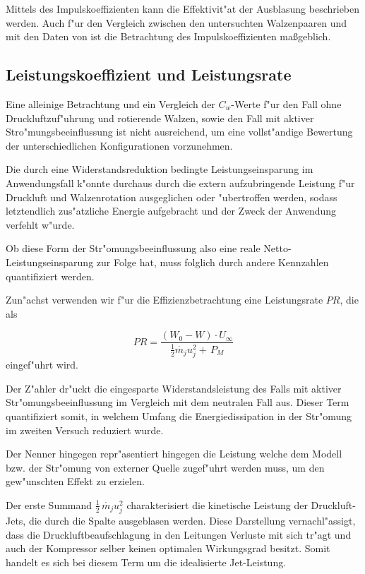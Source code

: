 Mittels des Impulskoeffizienten kann die Effektivit"at der Ausblasung beschrieben werden.
Auch f"ur den Vergleich zwischen den untersuchten Walzenpaaren und mit den Daten von \citep{Bilges.2018} ist die Betrachtung des Impulskoeffizienten ma\ss{}geblich.

\subsection{Leistungskoeffizient und Leistungsrate}
Eine alleinige Betrachtung und ein Vergleich der $C_w$-Werte f"ur den Fall ohne Druckluftzuf"uhrung und rotierende Walzen, sowie den Fall mit aktiver Stro"mungsbeeinflussung ist nicht ausreichend, um eine vollst"andige Bewertung der unterschiedlichen Konfigurationen vorzunehmen.

Die durch eine Widerstandsreduktion bedingte Leistungseinsparung im Anwendungsfall k"onnte durchaus durch die extern aufzubringende Leistung f"ur Druckluft und Walzenrotation ausgeglichen oder "ubertroffen werden, sodass letztendlich zus"atzliche Energie aufgebracht und der Zweck der Anwendung verfehlt w"urde.

Ob diese Form der Str"omungsbeeinflussung also eine reale Netto-Leistungseinsparung zur Folge hat, muss folglich durch andere Kennzahlen quantifiziert werden.

Zun"achst verwenden wir f"ur die Effizienzbetrachtung eine Leistungsrate $PR$, die als 

\begin{equation}
	\label{eq:leistungsrate}
	PR = \frac{(W_0 - W)\cdot U_{\infty}}{\frac{1}{2} \dot{m_j} u_j^2 + \, P_M}
\end{equation}
eingef"uhrt wird.\cite{Freund.1994}

Der Z"ahler dr"uckt die eingesparte Widerstandsleistung des Falls mit aktiver Str"omungsbeeinflussung im Vergleich mit dem neutralen Fall aus.
Dieser Term quantifiziert somit, in welchem Umfang die Energiedissipation in der Str"omung im zweiten Versuch reduziert wurde.

Der Nenner hingegen repr"asentiert hingegen die Leistung welche dem Modell bzw. der Str"omung von externer Quelle zugef"uhrt werden muss, um den gew"unschten Effekt zu erzielen.

Der erste Summand $\frac{1}{2}\,\dot{m_j} u_j^2$ charakterisiert die kinetische Leistung der Druckluft-Jets, die durch die Spalte ausgeblasen werden. Diese Darstellung vernachl"assigt, dass die  Druckluftbeaufschlagung in den Leitungen Verluste mit sich tr"agt und auch der Kompressor selber keinen optimalen Wirkungsgrad besitzt. Somit handelt es sich bei diesem Term um die idealisierte Jet-Leistung.

